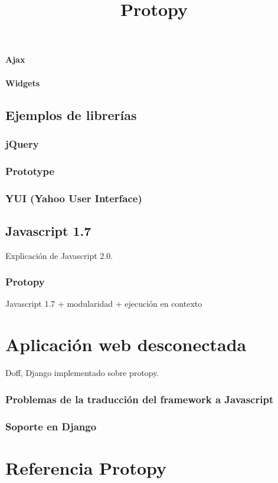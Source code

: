 \documentclass[a4paper]{report}
\begin{document}
\subsubsection{Ajax}
\subsubsection{Widgets}

\section{Ejemplos de librerías}
\subsection{jQuery}
\subsection{Prototype}
\subsection{YUI (Yahoo User Interface)}

\section{Javascript 1.7}
Explicación de Javascript 2.0.

\subsection{Protopy}
Javascript 1.7 + modularidad + ejecución en contexto

\chapter{Aplicación web desconectada}
Doff, Django implementado sobre protopy.
\subsection{Problemas de la traducción del framework a Javascript}
\subsection{Soporte en Django}


\appendix

\title{Protopy}
\chapter{Referencia Protopy}
\end{document}
